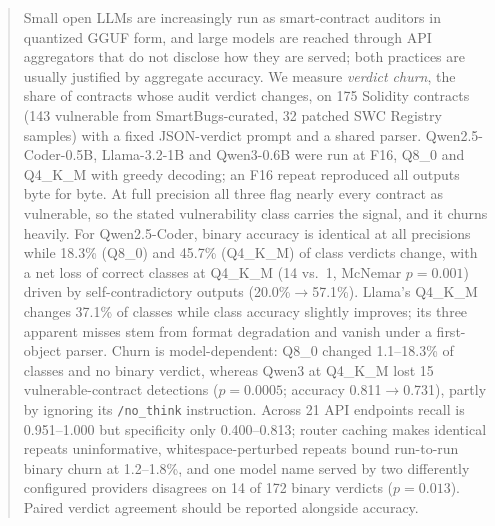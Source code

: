 \begin{abstract}
Small open LLMs are increasingly run as smart-contract auditors in quantized GGUF form, and large models are reached through API aggregators that do not disclose how they are served; both practices are usually justified by aggregate accuracy. We measure \emph{verdict churn}, the share of contracts whose audit verdict changes, on 175 Solidity contracts (143 vulnerable from SmartBugs-curated, 32 patched SWC Registry samples) with a fixed JSON-verdict prompt and a shared parser. Qwen2.5-Coder-0.5B, Llama-3.2-1B and Qwen3-0.6B were run at F16, Q8\_0 and Q4\_K\_M with greedy decoding; an F16 repeat reproduced all outputs byte for byte. At full precision all three flag nearly every contract as vulnerable, so the stated vulnerability class carries the signal, and it churns heavily. For Qwen2.5-Coder, binary accuracy is identical at all precisions while 18.3\% (Q8\_0) and 45.7\% (Q4\_K\_M) of class verdicts change, with a net loss of correct classes at Q4\_K\_M (14 vs.\ 1, McNemar $p=0.001$) driven by self-contradictory outputs (20.0\%$\to$57.1\%). Llama's Q4\_K\_M changes 37.1\% of classes while class accuracy slightly improves; its three apparent misses stem from format degradation and vanish under a first-object parser. Churn is model-dependent: Q8\_0 changed 1.1--18.3\% of classes and no binary verdict, whereas Qwen3 at Q4\_K\_M lost 15 vulnerable-contract detections ($p=0.0005$; accuracy 0.811$\to$0.731), partly by ignoring its \texttt{/no\_think} instruction. Across 21 API endpoints recall is 0.951--1.000 but specificity only 0.400--0.813; router caching makes identical repeats uninformative, whitespace-perturbed repeats bound run-to-run binary churn at 1.2--1.8\%, and one model name served by two differently configured providers disagrees on 14 of 172 binary verdicts ($p=0.013$). Paired verdict agreement should be reported alongside accuracy.
\end{abstract}
